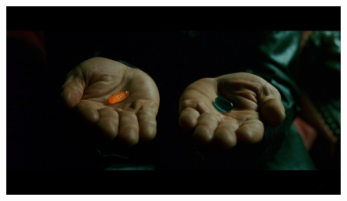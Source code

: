\begin{figure}
  \includegraphics{assets/images/bitcoin-orange-pill.jpg}
  \label{fig:blind-monks}
\end{figure}
%
%
%
